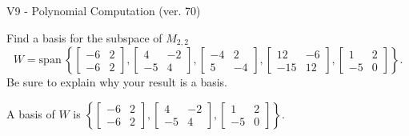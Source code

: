 \begin{exercise}
  \begin{exerciseTitle}V9 - Polynomial Computation (ver. 70)\end{exerciseTitle}
  \begin{exerciseStatement}
    Find a basis for the subspace of \(M_{2,2}\) 
\[W=\mathrm{span}\ \left\{\left[\begin{array}{cc}
-6 & 2 \\
-6 & 2
\end{array}\right] , \left[\begin{array}{cc}
4 & -2 \\
-5 & 4
\end{array}\right] , \left[\begin{array}{cc}
-4 & 2 \\
5 & -4
\end{array}\right] , \left[\begin{array}{cc}
12 & -6 \\
-15 & 12
\end{array}\right] , \left[\begin{array}{cc}
1 & 2 \\
-5 & 0
\end{array}\right]\right\}.\]
 Be sure to explain why your result is a basis.


  \end{exerciseStatement}
  \begin{exerciseAnswer}
   A basis of \(W\) is  \(\left\{\left[\begin{array}{cc}
-6 & 2 \\
-6 & 2
\end{array}\right] , \left[\begin{array}{cc}
4 & -2 \\
-5 & 4
\end{array}\right] , \left[\begin{array}{cc}
1 & 2 \\
-5 & 0
\end{array}\right]\right\}\).
  


  \end{exerciseAnswer}
\end{exercise}